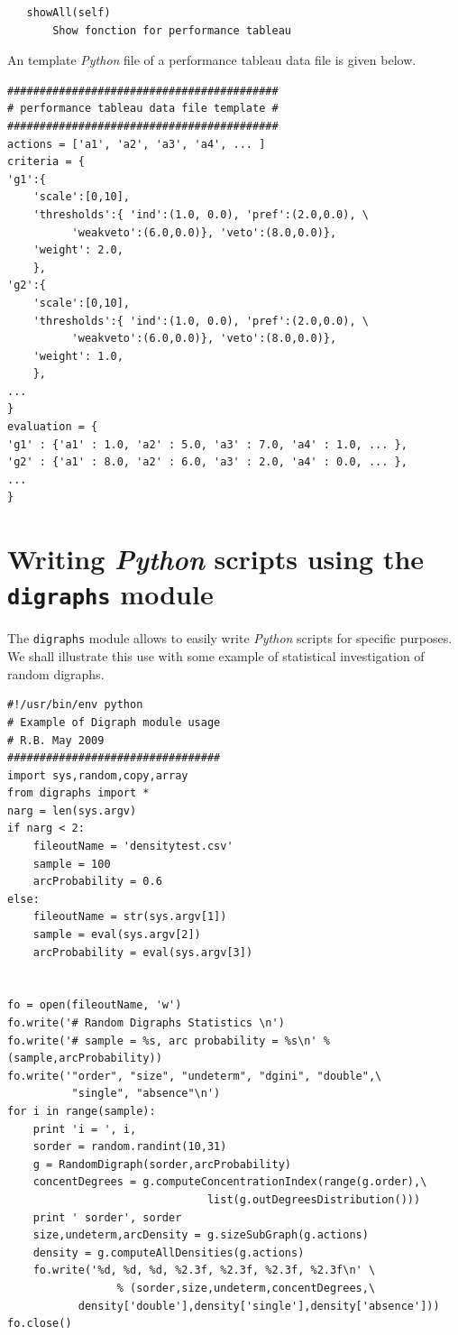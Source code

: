 \documentclass{article}
\newcommand{\+}{\verb+}
\renewcommand{\*}{\back{}}
\newcommand{\Dg}{\texttt{digraphs}\xspace }
\newcommand{\Py}{\emph{Python}\xspace }
\begin{document}
\begin{center}
\begin{example}
\begin{verbatim}
   showAll(self)
       Show fonction for performance tableau
\end{verbatim}
\end{example}
An template \Py file of a performance tableau data file is given below.
\begin{example}
\begin{verbatim}
##########################################
# performance tableau data file template #
##########################################
actions = ['a1', 'a2', 'a3', 'a4', ... ]
criteria = {
'g1':{
    'scale':[0,10],
    'thresholds':{ 'ind':(1.0, 0.0), 'pref':(2.0,0.0), \
          'weakveto':(6.0,0.0)}, 'veto':(8.0,0.0)},
    'weight': 2.0,
    },
'g2':{
    'scale':[0,10],
    'thresholds':{ 'ind':(1.0, 0.0), 'pref':(2.0,0.0), \
          'weakveto':(6.0,0.0)}, 'veto':(8.0,0.0)},
    'weight': 1.0,
    },
...
}
evaluation = {
'g1' : {'a1' : 1.0, 'a2' : 5.0, 'a3' : 7.0, 'a4' : 1.0, ... },
'g2' : {'a1' : 8.0, 'a2' : 6.0, 'a3' : 2.0, 'a4' : 0.0, ... },
...
}
\end{verbatim}
\end{example}
 
\section{Writing \Py scripts using the \Dg module}
\label{sec:writingscripts}
The \Dg module allows to easily write \Py scripts for specific purposes. We shall illustrate this use with some example of statistical investigation of random digraphs.
\begin{example}
\begin{verbatim}
#!/usr/bin/env python
# Example of Digraph module usage
# R.B. May 2009
#################################
import sys,random,copy,array
from digraphs import *
narg = len(sys.argv)
if narg < 2:
    fileoutName = 'densitytest.csv'
    sample = 100
    arcProbability = 0.6
else:
    fileoutName = str(sys.argv[1])
    sample = eval(sys.argv[2])
    arcProbability = eval(sys.argv[3])


fo = open(fileoutName, 'w')
fo.write('# Random Digraphs Statistics \n')
fo.write('# sample = %s, arc probability = %s\n' % (sample,arcProbability))
fo.write('"order", "size", "undeterm", "dgini", "double",\
          "single", "absence"\n')
for i in range(sample):
    print 'i = ', i,
    sorder = random.randint(10,31)
    g = RandomDigraph(sorder,arcProbability)
    concentDegrees = g.computeConcentrationIndex(range(g.order),\
                               list(g.outDegreesDistribution()))
    print ' sorder', sorder
    size,undeterm,arcDensity = g.sizeSubGraph(g.actions)
    density = g.computeAllDensities(g.actions)
    fo.write('%d, %d, %d, %2.3f, %2.3f, %2.3f, %2.3f\n' \
                 % (sorder,size,undeterm,concentDegrees,\
           density['double'],density['single'],density['absence']))
fo.close()
\end{verbatim}
\end{example}


\end{center}
\end{document}
